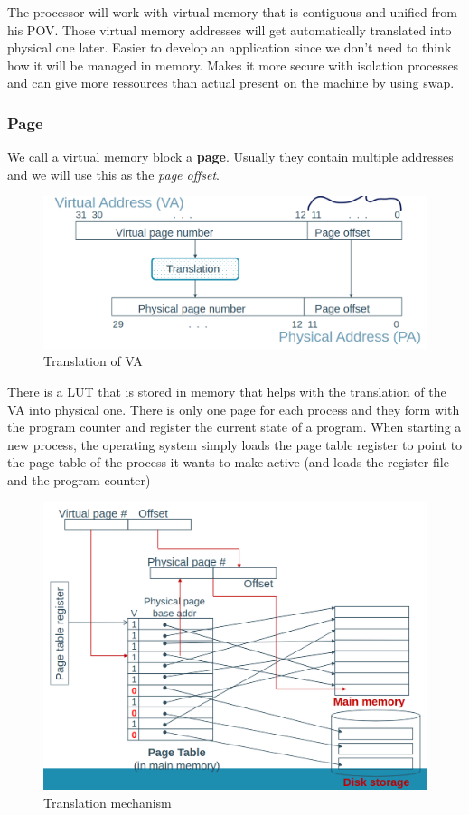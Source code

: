 \documentclass{report}
\begin{document}
The processor will work with virtual memory that is contiguous and unified from his POV. Those virtual memory addresses will get automatically translated into physical one later. Easier to develop an application since we don't need to think how it will be managed in memory. Makes it more secure with isolation processes and can give more ressources than actual present on the machine by using swap.

\subsubsection{Page}

We call a virtual memory block a \textbf{page}. Usually they contain multiple addresses and we will use this as the \textit{page offset}.

\begin{figure}[H]
    \centering
    \includegraphics[width=0.75\linewidth]{translation_VM.png}
    \caption{Translation of VA}
    \label{fig:translation-va-label}
\end{figure}

There is a LUT that is stored in memory that helps with the translation of the VA into physical one. There is only one page for each process and they form with the program counter and register the current state of a program. When starting a new process, the operating system simply loads the page table register to point to the page table of the process it wants to make active (and loads the register file and the program counter)

\begin{figure}[H]
    \centering
    \includegraphics[width=0.75\linewidth]{TLB_mechanism.png}
    \caption{Translation mechanism}
    \label{fig:tlb-label}
\end{figure}
\end{document}
